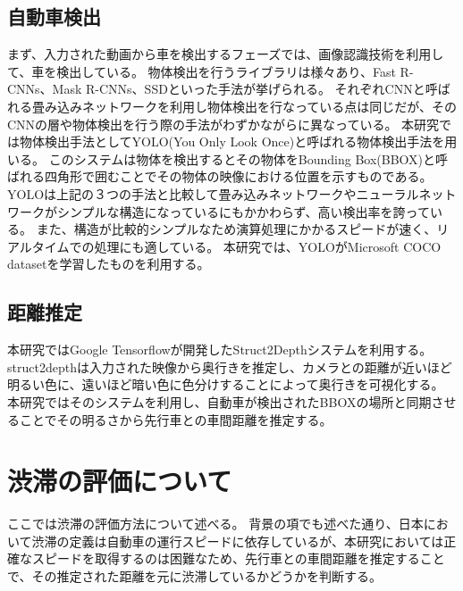 \subsection{自動車検出}
まず、入力された動画から車を検出するフェーズでは、画像認識技術を利用して、車を検出している。
物体検出を行うライブラリは様々あり、Fast R-CNNs、Mask R-CNNs、SSDといった手法が挙げられる。
それぞれCNNと呼ばれる畳み込みネットワークを利用し物体検出を行なっている点は同じだが、そのCNNの層や物体検出を行う際の手法がわずかながらに異なっている。
本研究では物体検出手法としてYOLO(You Only Look Once)と呼ばれる物体検出手法を用いる。
このシステムは物体を検出するとその物体をBounding Box(BBOX)と呼ばれる四角形で囲むことでその物体の映像における位置を示すものである。
YOLOは上記の３つの手法と比較して畳み込みネットワークやニューラルネットワークがシンプルな構造になっているにもかかわらず、高い検出率を誇っている。
また、構造が比較的シンプルなため演算処理にかかるスピードが速く、リアルタイムでの処理にも適している。
本研究では、YOLOがMicrosoft COCO datasetを学習したものを利用する。

\subsection{距離推定}
本研究ではGoogle Tensorflowが開発したStruct2Depthシステムを利用する。
struct2depthは入力された映像から奥行きを推定し、カメラとの距離が近いほど明るい色に、遠いほど暗い色に色分けすることによって奥行きを可視化する。
本研究ではそのシステムを利用し、自動車が検出されたBBOXの場所と同期させることでその明るさから先行車との車間距離を推定する。


\section{渋滞の評価について}
ここでは渋滞の評価方法について述べる。
背景の項でも述べた通り、日本において渋滞の定義は自動車の運行スピードに依存しているが、本研究においては正確なスピードを取得するのは困難なため、先行車との車間距離を推定することで、その推定された距離を元に渋滞しているかどうかを判断する。


